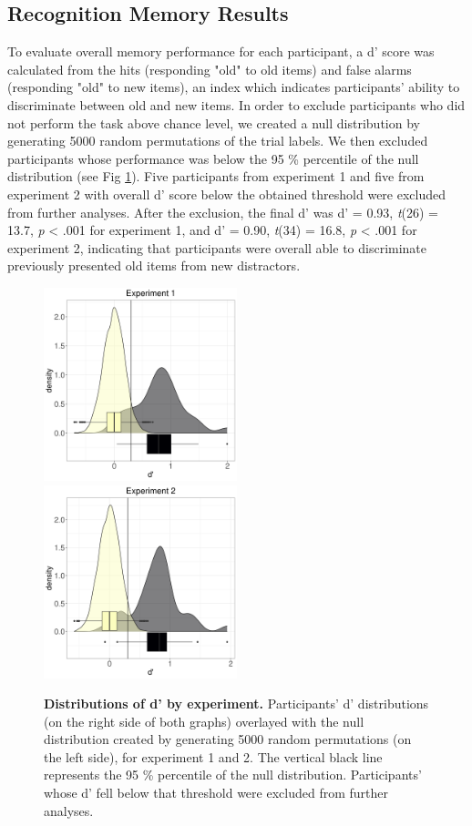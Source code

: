 \documentclass[a4paper,12pt]{article}
\begin{document}
\subsection{Recognition Memory Results}
To evaluate overall memory performance for each participant, a d' score was calculated from the hits (responding "old" to old items) and false alarms (responding "old" to new items), an index which indicates participants' ability to discriminate between old and new items. In order to exclude participants who did not perform the task above chance level, we created a null distribution by generating 5000 random permutations of the trial labels. We then excluded participants whose performance was below the 95 \% percentile of the null distribution (see Fig \ref{fig:dprime}). Five participants from experiment 1 and five from experiment 2 with overall d' score below the obtained threshold were excluded from further analyses. After the exclusion, the final d' was d' = 0.93,  \textit{t}(26) = 13.7, \textit{p} < .001 for experiment 1, and d’ = 0.90,  \textit{t}(34) = 16.8, \textit{p} < .001 for experiment 2, indicating that participants were overall able to discriminate previously presented old items from new distractors. \par


\begin{figure}[ht!]
{\includegraphics[width=0.5\textwidth]{figures/dprime_exp1.png}} \hfill
{\includegraphics[width=0.5\textwidth]{figures/dprime_exp2.png}} 
\caption{\textbf{Distributions of d' by experiment.} Participants' d' distributions (on the right side of both graphs) overlayed with the null distribution created by generating 5000 random permutations (on the left side), for experiment 1 and 2. The vertical black line represents the 95 \% percentile of the null distribution. Participants' whose d' fell below that threshold were excluded from further analyses.}
\label{fig:dprime}
\end{figure}
\end{document}
